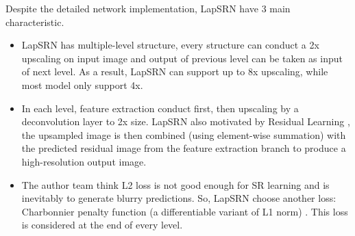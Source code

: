 \documentclass{article}
\begin{document}
  Despite the detailed network implementation, LapSRN have 3 main characteristic.
  \begin{itemize}
      \item LapSRN has multiple-level structure, every structure can conduct a 2x upscaling on input image and output of previous level can be taken as input of next level. 
      As a result, LapSRN can support up to 8x upscaling, while most model only support 4x. 
      \item In each level, feature extraction conduct first, then upscaling by a deconvolution layer to 2x size. 
      LapSRN also motivated by Residual Learning \cite{7}, the upsampled image is then combined (using element-wise summation) with the predicted residual image from the feature extraction branch to produce a high-resolution output image.
      \item The author team think L2 loss is not good enough for SR learning and is inevitably to generate blurry predictions. 
      So, LapSRN choose another loss: Charbonnier penalty function (a differentiable variant of L1 norm) \cite{3}. 
      This loss is considered at the end of every level.
  \end{itemize}
  
\end{document}
